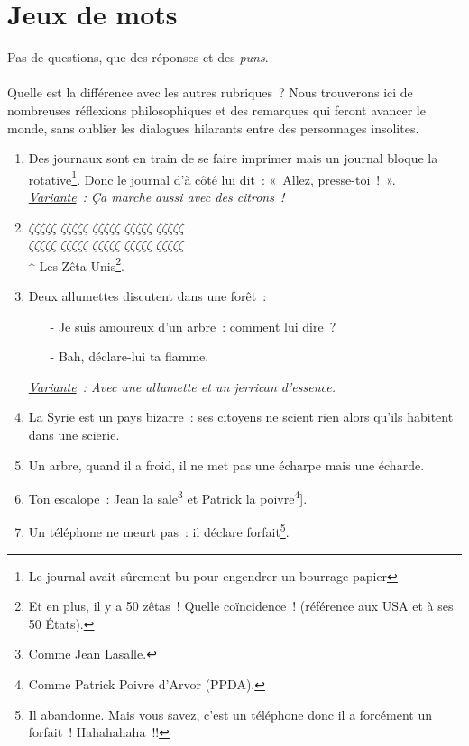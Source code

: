 \documentclass[10pt,a5paper,fullpage]{book}
\begin{document}
	\chapter{Jeux de mots}
	Pas de questions, que des réponses et des \textit{puns}. \\ \\
	Quelle est la différence avec les autres rubriques~? Nous trouverons ici de nombreuses réflexions philosophiques et des remarques qui feront avancer le monde, sans oublier les dialogues hilarants entre des personnages insolites. 
	\newpage
	\begin{enumerate}
		\item Des journaux sont en train de se faire imprimer mais un journal bloque la rotative\footnote{Le journal avait sûrement bu pour engendrer un bourrage papier}. Donc le journal d'à côté lui dit~: «~Allez, presse-toi~!~».
		\\ \textit{\underline{Variante}~: Ça marche aussi avec des citrons~!}
		\item $\zeta\zeta\zeta\zeta\zeta$ $\zeta\zeta\zeta\zeta\zeta$ $\zeta\zeta\zeta\zeta\zeta$ $\zeta\zeta\zeta\zeta\zeta$ $\zeta\zeta\zeta\zeta\zeta$ \\ 
		$\zeta\zeta\zeta\zeta\zeta$ $\zeta\zeta\zeta\zeta\zeta$ $\zeta\zeta\zeta\zeta\zeta$ $\zeta\zeta\zeta\zeta\zeta$  $\zeta\zeta\zeta\zeta\zeta$ \\
		↑ Les Zêta-Unis\footnote{Et en plus, il y a 50 zêtas~! Quelle coïncidence~! (référence aux USA et à ses 50 États).}.			
		\item Deux allumettes discutent dans une forêt~:
		\begin{itemize}
			\item[-] Je suis amoureux d’un arbre~: comment lui dire~?
			\item[-] Bah, déclare-lui ta flamme. 
		\end{itemize}
		\textit{\underline{Variante}~: Avec une allumette et un jerrican d’essence.}
		\item La Syrie est un pays bizarre~: ses citoyens ne scient rien alors qu'ils habitent dans une scierie. 
		\item Un arbre, quand il a froid, il ne met pas une écharpe mais une écharde.
		\item Ton escalope~: Jean la sale\footnote{Comme Jean Lasalle.} et Patrick la poivre\footnote{Comme Patrick Poivre d'Arvor (PPDA).}].
		\item Un téléphone ne meurt pas~: il déclare forfait\footnote{Il abandonne. Mais vous savez, c’est un téléphone donc il a forcément un forfait~! Hahahahaha~!!}.			

\end{enumerate}
\end{document}
